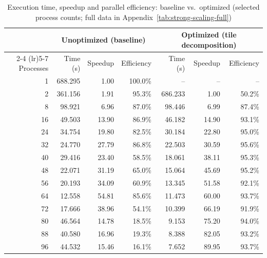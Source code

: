 \begin{table}[h]
    \centering
    \begin{tabular}{rrrrrrr}
        \toprule
        & \multicolumn{3}{c}{Unoptimized (baseline)} & \multicolumn{3}{c}{Optimized (tile decomposition)} \\
        \cmidrule(lr){2-4} \cmidrule(lr){5-7}
        Processes & Time (s) & Speedup & Efficiency & Time (s) & Speedup & Efficiency \\
        \midrule
        1 & 688.295 & 1.00 & 100.0\% & -- & -- & -- \\
        2 & 361.156 & 1.91 & 95.3\% & 686.233 & 1.00 & 50.2\% \\
        8 & 98.921 & 6.96 & 87.0\% & 98.446 & 6.99 & 87.4\% \\
        16 & 49.503 & 13.90 & 86.9\% & 46.182 & 14.90 & 93.1\% \\
        24 & 34.754 & 19.80 & 82.5\% & 30.184 & 22.80 & 95.0\% \\
        32 & 24.770 & 27.79 & 86.8\% & 22.503 & 30.59 & 95.6\% \\
        40 & 29.416 & 23.40 & 58.5\% & 18.061 & 38.11 & 95.3\% \\
        48 & 22.071 & 31.19 & 65.0\% & 15.064 & 45.69 & 95.2\% \\
        56 & 20.193 & 34.09 & 60.9\% & 13.345 & 51.58 & 92.1\% \\
        64 & 12.558 & 54.81 & 85.6\% & 11.473 & 60.00 & 93.7\% \\
        72 & 17.666 & 38.96 & 54.1\% & 10.399 & 66.19 & 91.9\% \\
        80 & 46.564 & 14.78 & 18.5\% & 9.153 & 75.20 & 94.0\% \\
        88 & 40.580 & 16.96 & 19.3\% & 8.388 & 82.05 & 93.2\% \\
        96 & 44.532 & 15.46 & 16.1\% & 7.652 & 89.95 & 93.7\% \\
        \bottomrule
    \end{tabular}
    \caption{Execution time, speedup and parallel efficiency: baseline vs.\ optimized (selected process counts; full data in Appendix~\ref{tab:strong-scaling-full})}
    \label{tab:strong-scaling-short}
\end{table}
